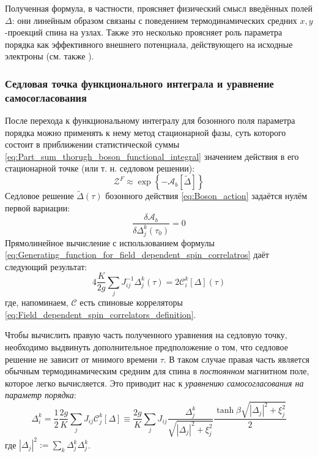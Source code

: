 Полученная формула, в частности, проясняет физический смысл введённых полей $\Delta$: они линейным образом связаны с поведением термодинамических средних $x,y$-проекций спина на узлах. Также это несколько проясняет роль параметра порядка как эффективного внешнего потенциала, действующего на исходные электроны (см. также \cite{deZhen}).

\subsubsection{Седловая точка функционального интеграла и уравнение самосогласования}
После перехода к функциональному интегралу для бозонного поля параметра порядка можно применять к нему метод стационарной фазы, суть которого состоит в приближении статистической суммы \eqref{eq:Part_sum_thorugh_boson_functional_integral} значением действия в его стационарной точке (или т. н. седловом решении):
\begin{equation}
	\label{eq:Partition_sum_saddle_point_approximation}
	 \mathcal{Z}^F \approx \exp\left\{ -\mathcal{A}_b \left[ \widetilde{\Delta} \right]	\right\}
\end{equation}
Седловое решение $\widetilde{\Delta}(\tau)$ бозонного действия \eqref{eq:Boson_action} задаётся нулём первой вариации:
$$
\frac{\delta \mathcal{A}_b }{\delta \Delta^k_j(\tau_0)} = 0
$$
Прямолинейное вычисление с использованием формулы \eqref{eq:Generating_function_for_field_dependent_spin_correlatros} даёт следующий результат:
\begin{equation}
	\label{eq:Saddle_point_equation}
	4 \frac{K}{2 g} \sum_j J^{-1}_{ij} \Delta^k_{j}(\tau) = 2\mathcal{C}^{k}_{i}[\Delta](\tau)
\end{equation}
где, напоминаем, $\mathcal{C}$ есть спиновые корреляторы \eqref{eq:Field_dependent_spin_correlators_definition}. 

Чтобы вычислить правую часть полученного уравнения на седловую точку, необходимо выдвинуть дополнительное предположение о том, что седловое решение не зависит от мнимого времени $\tau$. В таком случае правая часть является обычным термодинамическим средним для спина в \textit{постоянном} магнитном поле, которое легко вычисляется. Это приводит нас к \textit{уравнению самосогласования на параметр порядка}:
\begin{equation}
	\label{eq:Order_paramter_self_consistency}
	\Delta^k_i = \frac{1}{2} \frac{2g}{K} \sum_j J_{ij} \mathcal{C}^k_j[\Delta] \equiv \frac{2g}{K} \sum_j J_{ij} \frac{\Delta^k_j}{ \sqrt{ |\Delta_j|^2 + \xi_j^2} } \frac{ \tanh \beta \sqrt{ |\Delta_j|^2 + \xi_j^2} }{2}
\end{equation}
где $|\Delta_j|^2 := \sum_k \Delta^k_j \Delta^k_j$. 

